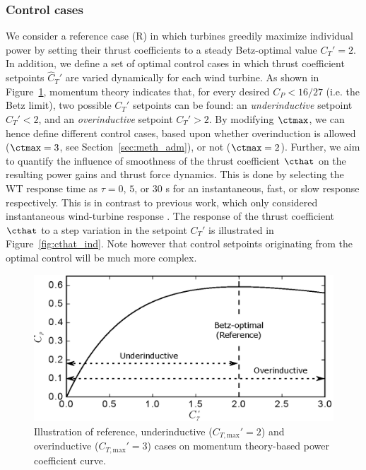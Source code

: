 \subsubsection{Control cases}

We consider a reference case (R) in which turbines greedily maximize individual power by setting their thrust coefficients to a steady Betz-optimal value $C_T' = 2$.  In addition, we define a set of optimal control cases in which thrust coefficient setpoints $\widehat{C}_T'$ are varied dynamically for each wind turbine. As shown in Figure~\ref{fig:under_overinductive}, momentum theory indicates that, for every desired $C_P < 16/27$ (i.e. the Betz limit), two possible $C_T'$ setpoints can be found: an \emph{underinductive} setpoint $C_T' < 2$, and an \emph{overinductive} setpoint $C_T' > 2$. By modifying $\ctmax$, we can hence define different control cases, based upon whether overinduction is allowed ($\ctmax = 3$, see Section~\ref{sec:meth_adm}), or not ($\ctmax = 2$). Further, we aim to quantify the influence of smoothness of the thrust coefficient $\cthat$ on the resulting power gains and thrust force dynamics. This is done by selecting the WT response time as $\tau = 0$, $5$, or $30$ s for an instantaneous, fast, or slow response respectively. This is in contrast to previous work, which only considered instantaneous wind-turbine response \citep{goit2015optimal,goit2016optimal}. The response of the thrust coefficient $\cthat$ to a step variation in the setpoint $C_T'$ is illustrated in Figure~\ref{fig:cthat_ind}. Note however that control setpoints originating from the optimal control will be much more complex.  

\begin{figure}[t]
	\centering
	\includegraphics[width=0.75\linewidth]{figures/meth_ct_ctprime_cp2.eps}
	\caption{Illustration of reference, underinductive ($C_{T,\text{max}}' = 2$) and overinductive ($C_{T,\text{max}}' = 3$) cases on momentum theory-based power coefficient curve.\label{fig:under_overinductive}}
\end{figure}

